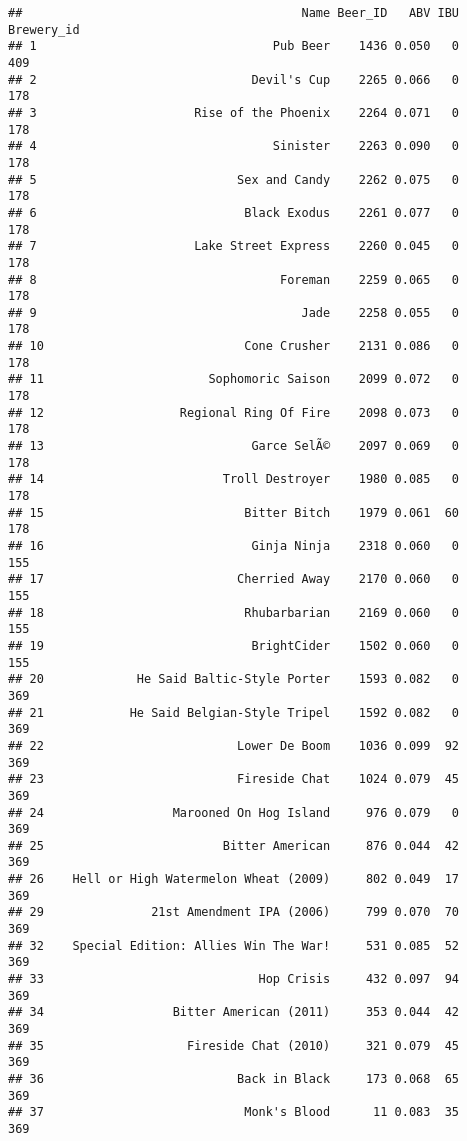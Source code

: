 \documentclass[
]{article}
\begin{document}
\begin{verbatim}
##                                       Name Beer_ID   ABV IBU Brewery_id
## 1                                 Pub Beer    1436 0.050   0        409
## 2                              Devil's Cup    2265 0.066   0        178
## 3                      Rise of the Phoenix    2264 0.071   0        178
## 4                                 Sinister    2263 0.090   0        178
## 5                            Sex and Candy    2262 0.075   0        178
## 6                             Black Exodus    2261 0.077   0        178
## 7                      Lake Street Express    2260 0.045   0        178
## 8                                  Foreman    2259 0.065   0        178
## 9                                     Jade    2258 0.055   0        178
## 10                            Cone Crusher    2131 0.086   0        178
## 11                       Sophomoric Saison    2099 0.072   0        178
## 12                   Regional Ring Of Fire    2098 0.073   0        178
## 13                             Garce SelÃ©    2097 0.069   0        178
## 14                         Troll Destroyer    1980 0.085   0        178
## 15                            Bitter Bitch    1979 0.061  60        178
## 16                             Ginja Ninja    2318 0.060   0        155
## 17                           Cherried Away    2170 0.060   0        155
## 18                            Rhubarbarian    2169 0.060   0        155
## 19                             BrightCider    1502 0.060   0        155
## 20             He Said Baltic-Style Porter    1593 0.082   0        369
## 21            He Said Belgian-Style Tripel    1592 0.082   0        369
## 22                           Lower De Boom    1036 0.099  92        369
## 23                           Fireside Chat    1024 0.079  45        369
## 24                  Marooned On Hog Island     976 0.079   0        369
## 25                         Bitter American     876 0.044  42        369
## 26    Hell or High Watermelon Wheat (2009)     802 0.049  17        369
## 29               21st Amendment IPA (2006)     799 0.070  70        369
## 32    Special Edition: Allies Win The War!     531 0.085  52        369
## 33                              Hop Crisis     432 0.097  94        369
## 34                  Bitter American (2011)     353 0.044  42        369
## 35                    Fireside Chat (2010)     321 0.079  45        369
## 36                           Back in Black     173 0.068  65        369
## 37                            Monk's Blood      11 0.083  35        369

\end{verbatim}
\end{document}
